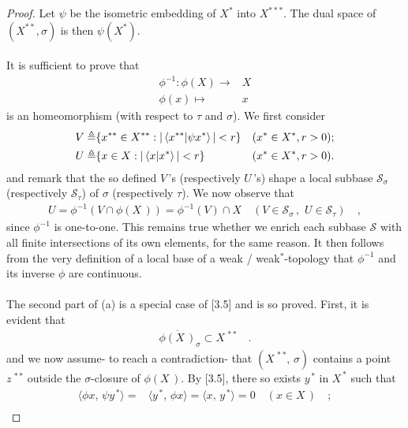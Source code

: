 \begin{proof}
Let $\psi$ be the isometric embedding of $X^\ast$ into $X^{\ast\ast\ast}$. %
The dual space of $(X^{\ast\ast},\sigma)$ is then $\psi(X^\ast)$. \\
\\
%
It is sufficient to prove that
\begin{align}
  \phi^{\minus 1}: \phi(X) \to & X \\
  \phi (x) \mapsto & x 
\end{align}
%
is an homeomorphism (with respect to $\tau$ and $\sigma$). We first consider
\begin{align}
  V \triangleq & \{
      x^{\ast\ast} \in X^{\ast\ast} :  
      \left\lvert\,  \bra{x^{\ast\ast} }\ket{\psi x^\ast} \,\right\rvert < r
    \} & (x^{\ast} \in X^{\ast}, r > 0); \\
  U \triangleq & \{
      x \in X : 
      \left\lvert\,  \bra{x}\ket{x^\ast}  \,\right\rvert < r 
    \} & (x^\ast \in X^\ast, r > 0 ).
\end{align}
and remark that the so defined $V\,$'s (respectively $U\,$'s) shape a local subbase $\mathscr{S}_\sigma$ (respectively $\mathscr{S}_\tau$) of $\sigma$ (respectively $\tau$). We now observe that 
\begin{align}
U=\phi^{\minus 1} \left(V \cap \phi(X\,) \right) = \phi^{\minus 1} (V)  \cap X \quad ( V\in \mathscr{S}_\sigma\,,\,\,U\in \mathscr{S}_\tau) \quad ,
\end{align}
since $\phi^{\minus 1}$ is one-to-one. This remains true whether we enrich each subbase $\mathscr{S}$ with all finite intersections of its own elements, for the same reason. It then follows from the very definition of a local base of a weak / weak$^\ast$-topology that $\phi^{\minus 1}$ and its inverse $\phi$ are continuous.\\
\\
The second part of (a) is a special case of [3.5] and is so proved. First, it is evident that 
\begin{align}
\overline{\phi(X\,)}_\sigma\subset X^{\,\ast\ast}\quad .
\end{align}
and we now assume- to reach a contradiction- that $(X^{\,\ast\ast},\, \sigma)$ contains a point $z^{\,\ast\ast}$ outside the $\sigma$-closure of $\phi(X\,)$. By [3.5], there so exists $y^{\,\ast}$ in $X^{\,\ast}$ such that 
\begin{align}
\label{4_1_6} \langle \phi x,\, \psi y^{\,\ast} \rangle=&\langle  y^{\,\ast} ,\,\phi x \rangle= \langle x,\, y^{\,\ast}\rangle= 0\quad (x\in X\,)\quad ; \\

\end{align}
\end{proof}
